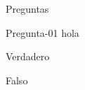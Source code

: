 \documentclass[10pt]{article}
\newcommand{\hola}{hola}
\begin{document}
\begin{quiz}{Preguntas}

\begin{multi}[]%
    {Pregunta-01}
    \hola
    \item* Verdadero
    \item Falso
\end{multi}

\end{quiz}
\end{document}
